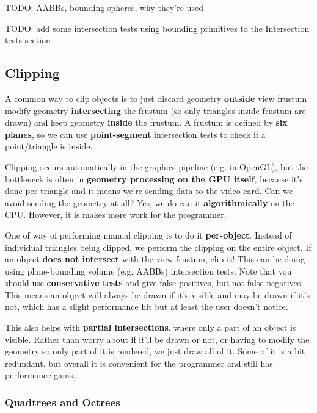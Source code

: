 \documentclass{article}
\begin{document}
TODO: AABBs, bounding spheres, why they're used

TODO: add some intersection tests using bounding primitives to the Intersection tests section

\subsection{Clipping}

A common way to clip objects is to just discard geometry \textbf{outside} view frustum modify geometry \textbf{intersecting} the frustum (so only triangles inside frustum are drawn) and keep geometry \textbf{inside} the frustum. A frustum is defined by \textbf{six planes}, so we can use \textbf{point-segment} intersection tests to check if a point/triangle is inside.

Clipping occurs automatically in the graphics pipeline (e.g. in OpenGL), but the bottleneck is often in \textbf{geometry processing on the GPU itself}, because it's done per triangle and it means we're sending data to the video card. Can we avoid sending the geometry at all? Yes, we do can it \textbf{algorithmically} on the CPU. However, it is makes more work for the programmer.

One of way of performing manual clipping is to do it \textbf{per-object}. Instead of individual triangles being clipped, we perform the clipping on the entire object. If an object \textbf{does not intersect} with the view frustum, clip it! This can be doing using plane-bounding volume (e.g. AABBs) intersection tests. Note that you should use \textbf{conservative tests} and give false positives, but not false negatives. This means an object will always be drawn if it's visible and may be drawn if it's not, which has a slight performance hit but at least the user doesn't notice.

This also helps with \textbf{partial intersections}, where only a part of an object is visible. Rather than worry about if it'll be drawn or not, or having to modify the geometry so only part of it is rendered, we just draw all of it. Some of it is a bit redundant, but overall it is convenient for the programmer and still has performance gains.

\subsubsection{Quadtrees and Octrees}
\end{document}
